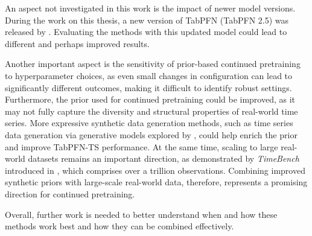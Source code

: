 An aspect not investigated in this work is the impact of newer model versions.
During the work on this thesis, a new version of TabPFN (TabPFN 2.5) was released by \citet{grinsztajn2025tabpfn}.
Evaluating the methods with this updated model could lead to different and perhaps improved results.

Another important aspect is the sensitivity of prior-based continued pretraining to hyperparameter choices, as even small changes in configuration can lead to significantly different outcomes, making it difficult to identify robust settings.
Furthermore, the prior used for continued pretraining could be improved, as it may not fully capture the diversity and structural properties of real-world time series.
More expressive synthetic data generation methods, such as time series data generation via generative models explored by \citet{lawrence2021dgp}, could help enrich the prior and improve TabPFN-TS performance.
At the same time, scaling to large real-world datasets remains an important direction, as demonstrated by \textit{TimeBench} introduced in \citet{liu2025sundial}, which comprises over a trillion observations.
Combining improved synthetic priors with large-scale real-world data, therefore, represents a promising direction for continued pretraining.

Overall, further work is needed to better understand when and how these methods work best and how they can be combined effectively.





